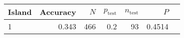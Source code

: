 
\begin{tabular}{lrrrrrl}
\toprule
Island & Accuracy & $N$ & $p_{\mbox{test}}$ & $n_{\mbox{test}}$ & $P$ & \\
\midrule
1 & 0.343 & 466 & 0.2 & 93 & 0.4514 & \\
\bottomrule
\end{tabular}
